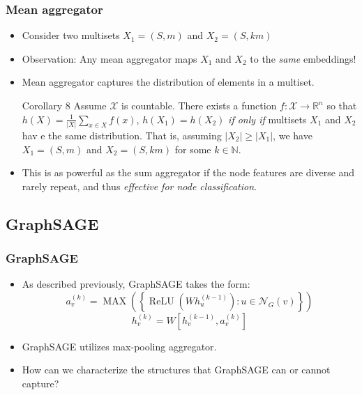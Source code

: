 \documentclass[handout]{beamer}
\DeclareMathOperator{\MAX}{MAX}
\DeclareMathOperator{\relu}{ReLU}
\begin{document}
\begin{frame}
\frametitle{Mean aggregator}

\begin{itemize}
	\item Consider two multisets $X_1 = (S, m)$ and $X_2 = (S, k m)$ \pause
	
	\item Observation: Any mean aggregator maps $X_1$ and $X_2$ to the {\it same} embeddings! \pause
	
	\item Mean aggregator captures the \alert{distribution of elements in a multiset}. \pause

\begin{block}{Corollary 8}
Assume $\mathcal{X}$ is countable.
There exists a function $f : \mathcal{X} \rightarrow \mathbb{R}^n$ so that $h(X) = \frac{1}{|X|}\sum_{x \in X} f(x)$, $h(X_1) = h(X_2)$ {\it if only if} multisets $X_1$ and $X_2$ hav e the same distribution.
That is, assuming $|X_2| \geq |X_1|$, we have $X_1 = (S, m)$ and $X_2 = (S, k m)$ for some $k \in \mathbb{N}$.

\end{block} \pause

	\item This is as powerful as the sum aggregator if the node features are diverse and rarely repeat, and thus {\it effective for node classification}.

\end{itemize}
\end{frame}



\subsection{GraphSAGE}

\begin{frame}
\frametitle{GraphSAGE}

\begin{itemize}
	\item As described previously, GraphSAGE takes the form:
	$$a_v^{(k)} = \MAX \left( \left\{ \relu \left( W h_u^{(k - 1)} \right) : u \in \mathcal{N}_G(v) \right\} \right)$$
	$$h_v^{(k)} = W \left[ h_v^{(k - 1)}, a_v^{(k)} \right]$$ \pause
	
	\item GraphSAGE utilizes max-pooling aggregator. \pause
	
	\item How can we characterize the structures that GraphSAGE can or cannot capture?
\end{itemize}

\end{frame}
\end{document}
